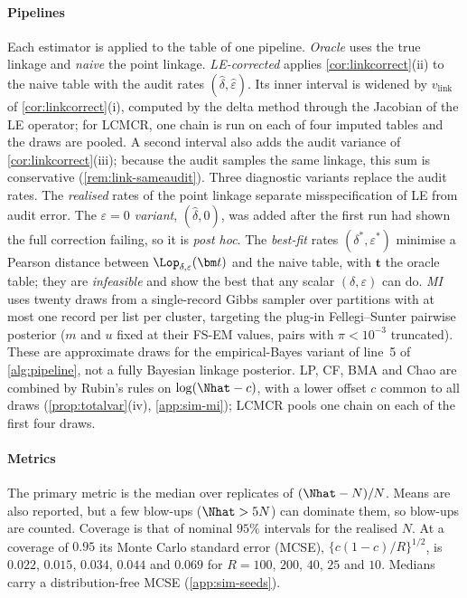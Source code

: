 \paragraph{Pipelines} Each estimator is applied to the table of one pipeline. \emph{Oracle} uses the true linkage and \emph{naive} the point linkage. \emph{LE-corrected} applies \cref{cor:linkcorrect}(ii) to the naive table with the audit rates $(\hat\delta,\hat\varepsilon)$. Its inner interval is widened by $v_{\mathrm{link}}$ of \cref{cor:linkcorrect}(i), computed by the delta method through the Jacobian of the LE operator; for LCMCR, one chain is run on each of four imputed tables and the draws are pooled. A second interval also adds the audit variance of \cref{cor:linkcorrect}(iii); because the audit samples the same linkage, this sum is conservative (\cref{rem:link-sameaudit}). Three diagnostic variants replace the audit rates. The \emph{realised} rates of the point linkage separate misspecification of LE from audit error. The \emph{$\varepsilon=0$ variant}, $(\hat\delta,0)$, was added after the first run had shown the full correction failing, so it is \emph{post hoc}. The \emph{best-fit} rates $(\delta^\ast,\varepsilon^\ast)$ minimise a Pearson distance between $\Lop_{\delta,\varepsilon}(\bm t)$ and the naive table, with $\bm t$ the oracle table; they are \emph{infeasible} and show the best that any scalar $(\delta,\varepsilon)$ can do. \emph{MI} uses twenty draws from a single-record Gibbs sampler over partitions with at most one record per list per cluster, targeting the plug-in Fellegi--Sunter pairwise posterior ($m$ and $u$ fixed at their FS-EM values, pairs with $\pi<10^{-3}$ truncated). These are approximate draws for the empirical-Bayes variant of line~5 of \cref{alg:pipeline}, not a fully Bayesian linkage posterior. LP, CF, BMA and Chao are combined by Rubin's rules \citep{rubin1987} on $\log(\Nhat-c)$, with a lower offset $c$ common to all draws (\cref{prop:totalvar}(iv), \cref{app:sim-mi}); LCMCR pools one chain on each of the first four draws.

\paragraph{Metrics} The primary metric is the median over replicates of $(\Nhat-N)/N$. Means are also reported, but a few blow-ups ($\Nhat>5N$) can dominate them, so blow-ups are counted. Coverage is that of nominal $95\%$ intervals for the realised $N$. At a coverage of $0.95$ its Monte Carlo standard error (MCSE), $\{c(1-c)/R\}^{1/2}$, is $0.022$, $0.015$, $0.034$, $0.044$ and $0.069$ for $R=100$, $200$, $40$, $25$ and $10$. Medians carry a distribution-free MCSE (\cref{app:sim-seeds}).

